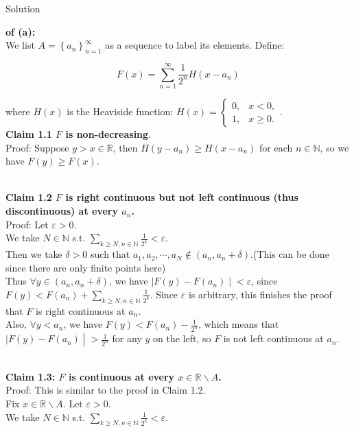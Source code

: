\begin{qlsolution}{Solution}

\textbf{of (a):}\\
We list \(A = \left\{ a_{n} \right\}_{n = 1}^{\infty}\) as a sequence to label its elements. Define:

\[F(x) = \sum\limits_{n = 1}^{\infty}\frac{1}{2^{n}}H(x - a_{n})\]

where \(H(x)\) is the Heaviside function: \(H(x) = \left\{ \begin{matrix}
{0,} & {x < 0,} \\
{1,} & {x \geq 0.}
\end{matrix} \right.\).\\
\textbf{Claim 1.1 \(F\) is non-decreasing}.\\
Proof: Suppose \(y > x \in \mathbb{R}\), then \(H(y - a_{n}) \geq H(x - a_{n})\) for each \(n \in \mathbb{N}\), so we have \(F(y) \geq F(x)\).\\
\strut \\
\textbf{Claim 1.2 \(F\) is right continuous but not left continuous (thus discontinuous) at every \(a_{n}\).}\\
Proof: Let \(\varepsilon > 0\).\\
We take \(N \in \mathbb{N}\) s.t. \(\sum_{k \geq N,n \in \mathbb{N}}\frac{1}{2^{k}} < \varepsilon\).\\
Then we take \(\delta > 0\) such that \(a_{1},a_{2},\cdots,a_{N} \notin (a_{n},a_{n} + \delta)\).(This can be done since there are only finite points here)\\
Thus \(\forall y \in (a_{n},a_{n} + \delta)\), we have \(\left. |F(y) - F(a_{n}) \middle| < \varepsilon \right.\), since \(F(y) < F(a_{n}) + \sum_{k \geq N,n \in \mathbb{N}}\frac{1}{2^{k}}\). Since \(\varepsilon\) is arbitrary, this finishes the proof that \(F\) is right continuous at \(a_{n}\).\\
Also, \(\forall y < a_{n}\), we have \(F(y) < F(a_{n}) - \frac{1}{2^{n}}\), which means that \(\left. |F(y) - F(a_{n}) \middle| > \frac{1}{2^{n}} \right.\) for any \(y\) on the left, so \(F\) is not left continuous at \(a_{n}\).\\
\strut \\
\textbf{Claim 1.3: \(F\) is continuous at every \(x \in \mathbb{R}\backslash A\).}\\
Proof: This is similar to the proof in Claim 1.2.\\
Fix \(x \in \mathbb{R}\backslash A\). Let \(\varepsilon > 0\).\\
We take \(N \in \mathbb{N}\) s.t. \(\sum_{k \geq N,n \in \mathbb{N}}\frac{1}{2^{k}} < \varepsilon\).\\

\end{qlsolution}
